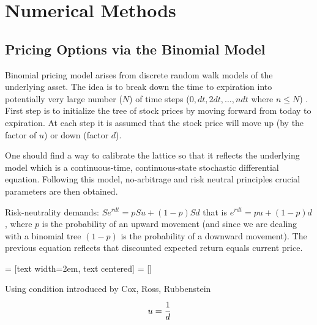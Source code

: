\chapter{Numerical Methods}
\label{ch:numerical_approx}

\section{Pricing Options via the Binomial Model}

Binomial pricing model arises from discrete random walk models of the underlying asset. The idea is to break down the time to expiration into potentially very large number ($N$) of time steps ($0, dt, 2dt,\ldots , ndt$ where $n\leq N$) . First step is to initialize the tree of stock prices by moving forward from today to expiration. At each step it is assumed that the stock price will move up (by the factor of $u$) or down (factor $d$).

One should find a way to calibrate the lattice so that it reflects the underlying model which is a continuous-time, continuous-state stochastic differential equation. Following this model, no-arbitrage and risk neutral principles crucial parameters are then obtained.

Risk-neutrality demands: $Se^{rdt} = pSu + (1-p)Sd$ that is $e^{rdt} = pu + (1-p)d$, where $p$ is the probability of an upward movement (and since we are dealing with a binomial tree $(1-p)$ is the probability of a downward movement). The previous equation reflects that discounted expected return equals current price.

 = [text width=2em, text centered]
 = []

Using condition introduced by Cox, Ross, Rubbenstein
\begin{equation}
u = \cfrac{1}{d}
\end{equation}

